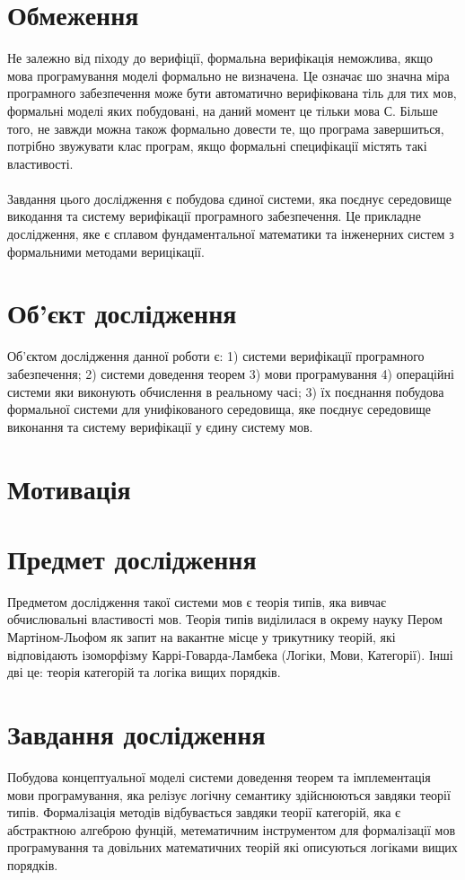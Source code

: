 \section{Обмеження}
Не залежно від піходу до верифіції, формальна верифікація неможлива,
якщо мова програмування моделі формально не визначена. Це означає шо значна міра
програмного забезпечення може бути автоматично верифікована тіль для тих мов,
формальні моделі яких побудовані, на даний момент це тільки мова С.
Більше того, не завжди можна також формально довести те, що програма завершиться,
потрібно звужувати клас програм, якщо формальні специфікації містять такі властивості.

\paragraph{}
Завдання цього дослідження є побудова єдиної системи, яка поєднує середовище
викодання та систему верифікації програмного забезпечення. Це прикладне дослідження,
яке є сплавом фундаментальної математики та інженерних систем з формальними методами верицікації.

\section{Об'єкт дослідження}
Об'єктом дослідження данної роботи є: 1) системи верифікації
програмного забезпечення; 2) системи доведення теорем 3) мови програмування
4) операційні системи яки виконують
обчислення в реальному часі; 3) їх поєднання побудова формальної системи для
унифікованого середовища, яке поєднує середовище виконання та систему
верифікації у єдину систему мов.

\section{Мотивація}

\section{Предмет дослідження}
Предметом дослідження такої системи мов є теорія типів, яка вивчає обчислювальні властивості мов.
Теорія типів виділилася в окрему науку Пером Мартіном-Льофом як запит на вакантне місце у
трикутнику теорій, які відповідають ізоморфізму Каррі-Говарда-Ламбека (Логіки, Мови, Категорії).
Інші дві це: теорія категорій та логіка вищих порядків.

\section{Завдання дослідження}
Побудова концептуальної моделі системи доведення теорем та
імплементація мови програмування,
яка релізує логічну семантику здійснюються завдяки теорії типів.
Формалізація методів відбувається завдяки теорії категорій,
яка є абстрактною алгеброю фунцій, метематичним інструментом
для формалізації мов програмування та довільних
математичних теорій які описуються логіками вищих порядків.

